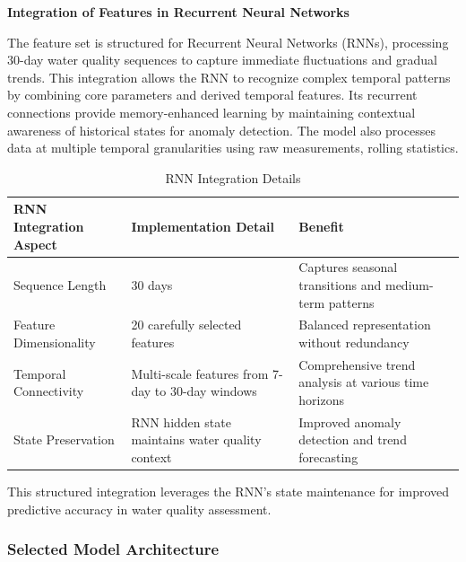 \textbf{Integration of Features in Recurrent Neural Networks}

The feature set is structured for Recurrent Neural Networks (RNNs), processing 30-day water quality sequences to capture immediate fluctuations and gradual trends. This integration allows the RNN to recognize complex temporal patterns by combining core parameters and derived temporal features. Its recurrent connections provide memory-enhanced learning by maintaining contextual awareness of historical states for anomaly detection. The model also processes data at multiple temporal granularities using raw measurements, rolling statistics.

\begin{table}[h]
\centering
\caption{RNN Integration Details}
\begin{tabular}{|p{6cm}|p{5cm}|p{5cm}|}
\hline
\textbf{RNN Integration Aspect} & \textbf{Implementation Detail} & \textbf{Benefit} \\
\hline
Sequence Length & 30 days & Captures seasonal \newline transitions and medium-\newline term patterns \\
\hline
Feature Dimensionality & 20 carefully selected \newline features & Balanced representation \newline  without redundancy \\
\hline
Temporal Connectivity & Multi-scale features from 7-day to 30-day windows & Comprehensive trend \newline analysis at various time \newline horizons \\
\hline
State Preservation & RNN hidden state \newline maintains water quality \newline context & Improved anomaly \newline detection and trend \newline forecasting \\
\hline
\end{tabular}
\end{table}

This structured integration leverages the RNN's state maintenance for improved predictive accuracy in water quality assessment.

\subsubsection{Selected Model Architecture}

